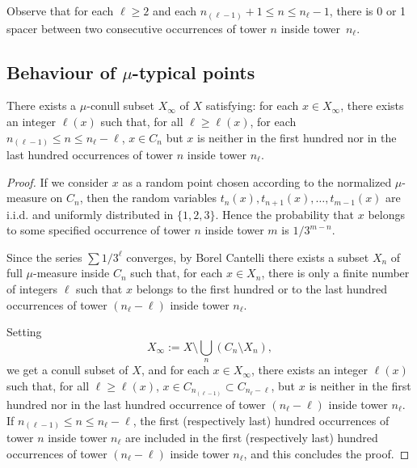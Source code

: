 \documentclass[AHL,Unicode,longabstracts]{cedram}
\newcommand{\egdef}{:=}
\begin{document}
\begin{rema}\label{remark:01spacer}
Observe that for each $\ell\ge2$ and each $n_{(\ell-1)}+1\le n\le n_\ell - 1$, there is 0 or 1 spacer between two consecutive occurrences of tower $n$ inside tower~$n_\ell$.
\end{rema}

\subsection{Behaviour of \texorpdfstring{$\mu$}{mu}-typical points}
\label{sec:typical}

\begin{lemm}\label{lemma:Xinfty}
There exists a $\mu$-conull subset $X_\infty$ of $X$ satisfying: for each $x\in X_\infty$, there exists an integer $\ell(x)$ such that, for all $\ell\ge
\ell(x)$, for each $n_{(\ell-1)} \le n \le n_\ell -\ell$, $x\in C_n$ but $x$ is neither in the first hundred nor in the last hundred occurrences of tower $n$ inside tower $n_\ell$.
\end{lemm}

\begin{proof}
If we consider $x$ as a random point chosen according to the normalized $\mu$-measure on $C_n$, then the random variables $t_n(x),t_{n+1}(x),\ldots,t_{m-1}(x)$ are i.i.d. and uniformly distributed in $\{1,2,3\}$. Hence the probability that $x$ belongs to some specified occurrence of tower $n$ inside tower $m$ is $1/3^{m-n}$.

Since the series $\sum 1/3^\ell$ converges, by Borel Cantelli there exists a subset $X_n$ of full $\mu$-measure inside $C_n$ such that, for each $x\in X_n$, there is only a finite number of integers $\ell$ such that $x$ belongs to the first hundred or to the last hundred occurrences of tower $(n_\ell-\ell)$ inside tower $n_\ell$.

Setting
\[
X_\infty \egdef X\setminus \bigcup_n \left(C_n\setminus X_n\right),
\]
we get a conull subset of $X$, and for each $x\in X_\infty$, there exists an integer $\ell(x)$ such that, for all $\ell\ge \ell(x)$, $x\in C_{n_{(\ell-1)}}\subset C_{n_\ell-\ell}$, but $x$ is neither in the first hundred nor in the last hundred occurrence of tower $(n_\ell-\ell)$ inside tower $n_\ell$. If $n_{(\ell-1)} \le n \le n_\ell -\ell$, the first (respectively last) hundred occurrences of tower $n$ inside tower $n_\ell$ are included in the first (respectively last) hundred occurrences of tower $(n_\ell-\ell)$ inside tower $n_\ell$, and this concludes the proof.
\end{proof}
\end{document}
